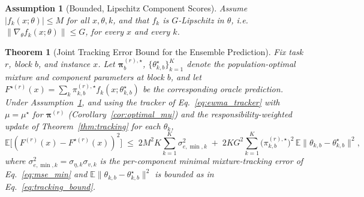 ﻿\documentclass[12pt,a4paper]{article}
\newtheorem{assumption}{Assumption}
\newtheorem{theorem}{Theorem}
\newcommand{\E}{\mathbb{E}}
\begin{document}
\begin{assumption}[Bounded, Lipschitz Component Scores]
\label{as:bounded_lipschitz}
Assume $|f_k(x;\theta)|\leq M$ for all $x,\theta,k$, and that $f_k$ is
$G$-Lipschitz in $\theta$, i.e.\ $\|\nabla_\theta f_k(x;\theta)\|\leq G$, for
every $x$ and every $k$.
\end{assumption}

\begin{theorem}[Joint Tracking Error Bound for the Ensemble Prediction]
\label{thm:joint_tracking}
Fix task $r$, block $b$, and instance $x$. Let $\bm\pi_b^{(r),\star}$,
$\{\theta_{k,b}^\star\}_{k=1}^K$ denote the population-optimal mixture and
component parameters at block $b$, and let $F^{\star(r)}(x)=\sum_k \pi_{k,b}^{(r),\star}f_k(x;\theta_{k,b}^\star)$
be the corresponding oracle prediction. Under
Assumption~\ref{as:bounded_lipschitz}, and using the tracker of
Eq.~\eqref{eq:ewma_tracker} with $\mu=\mu^\star$ for $\bm\pi^{(r)}$
(Corollary~\ref{cor:optimal_mu}) and the responsibility-weighted update of
Theorem~\ref{thm:tracking} for each $\theta_k$,
\begin{equation}
\E\big[(F^{(r)}(x)-F^{\star(r)}(x))^2\big]
\;\leq\;
2M^2K\sum_{k=1}^{K}\sigma_{e,\min,k}^2
\;+\;
2KG^2\sum_{k=1}^{K}\big(\pi_{k,b}^{(r),\star}\big)^2\,
\E\|\theta_{k,b}-\theta_{k,b}^\star\|^2,
\label{eq:joint_tracking_bound}
\end{equation}
where $\sigma_{e,\min,k}^2=\sigma_{\eta,k}\sigma_{v,k}$ is the per-component
minimal mixture-tracking error of Eq.~\eqref{eq:mse_min} and
$\E\|\theta_{k,b}-\theta_{k,b}^\star\|^2$ is bounded as in
Eq.~\eqref{eq:tracking_bound}.
\end{theorem}
\end{document}
